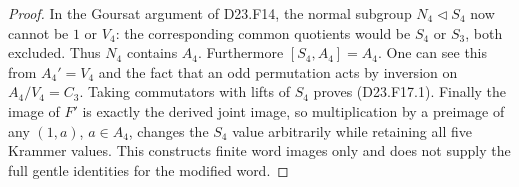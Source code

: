 \begin{proof}
In the Goursat argument of D23.F14, the normal
subgroup $N_4\triangleleft S_4$ now cannot be
$1$ or $V_4$: the corresponding common quotients
would be $S_4$ or $S_3$, both excluded. Thus
$N_4$ contains $A_4$. Furthermore
$[S_4,A_4]=A_4$. One can see this from
$A_4'=V_4$ and the fact that an odd permutation
acts by inversion on $A_4/V_4=C_3$.
Taking commutators with lifts of $S_4$ proves
(D23.F17.1).  Finally the image of $F'$ is exactly
the derived joint image, so multiplication by
a preimage of any $(1,a)$, $a\in A_4$, changes
the $S_4$ value arbitrarily while retaining all
five Krammer values.  This constructs finite
word images only and does not supply the full
gentle identities for the modified word.
\end{proof}
